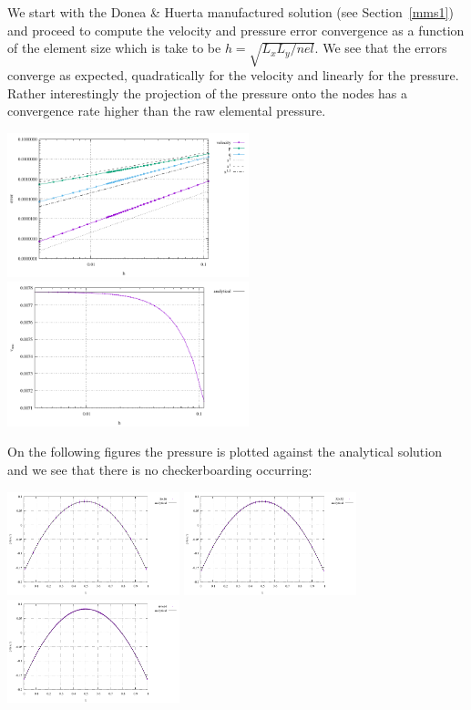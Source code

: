 We start with the Donea \& Huerta manufactured solution (see Section~\ref{mms1}) and 
proceed to compute the velocity and pressure error convergence as a function of the 
element size which is take to be $h = \sqrt{L_xL_y/nel}$. We see that 
the errors converge as expected, quadratically for the velocity and linearly for the pressure.
Rather interestingly the projection of the pressure onto the nodes has a convergence rate 
higher than the raw elemental pressure. 

\begin{center}
\includegraphics[width=7cm]{python_codes/fieldstone_78/results/mms/errors.pdf}
\includegraphics[width=7cm]{python_codes/fieldstone_78/results/mms/vrms.pdf}
\end{center}

On the following figures the pressure is plotted against the analytical solution and 
we see that there is no checkerboarding occurring:

\begin{center}
\includegraphics[width=5cm]{python_codes/fieldstone_78/results/mms/pressure16}
\includegraphics[width=5cm]{python_codes/fieldstone_78/results/mms/pressure32}
\includegraphics[width=5cm]{python_codes/fieldstone_78/results/mms/pressure64}\\
\end{center}

